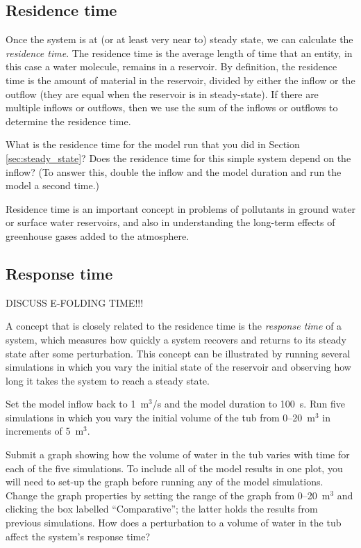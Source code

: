 \documentclass[11pt,letterpaper]{article}
\begin{document}
\subsection{Residence time\label{sec:residence_time}}
Once the system is at (or at least very near to) steady state, we can calculate the \textit{residence time}. The residence time is the average length of time that an entity, in this case a water molecule, remains in a reservoir. By definition, the residence time is the amount of material in the reservoir, divided by either the inflow or the outflow (they are equal when the reservoir is in steady-state). If there are multiple inflows or outflows, then we use the sum of the inflows or outflows to determine the residence time. 

What is the residence time for the model run that you did in Section \ref{sec:steady_state}? Does the residence time for this simple system depend on the inflow? (To answer this, double the inflow and the model duration and run the model a second time.)

Residence time is an important concept in problems of pollutants in ground water or surface water reservoirs, and also in understanding the long-term effects of greenhouse gases added to the atmosphere.

\subsection{Response time}
DISCUSS E-FOLDING TIME!!!

A concept that is closely related to the residence time is the \textit{response time} of a system, which measures how quickly a system recovers and returns to its steady state after some perturbation. This concept can be illustrated by running several simulations in which you vary the initial state of the reservoir and observing how long it takes the system to reach a steady state. 

Set the model inflow back to 1~m$^3$/s and the model duration to 100~s. Run five simulations in which you vary the initial volume of the tub from 0--20~m$^3$ in increments of 5~m$^3$.

Submit a graph showing how the volume of water in the tub varies with time for each of the five simulations. To include all of the model results in one plot, you will need to set-up the graph before running any of the model simulations. Change the graph properties by setting the range of the graph from 0--20~m$^3$ and clicking the box labelled ``Comparative''; the latter holds the results from previous simulations. How does a perturbation to a volume of water in the tub affect the system's response time?
\end{document}
